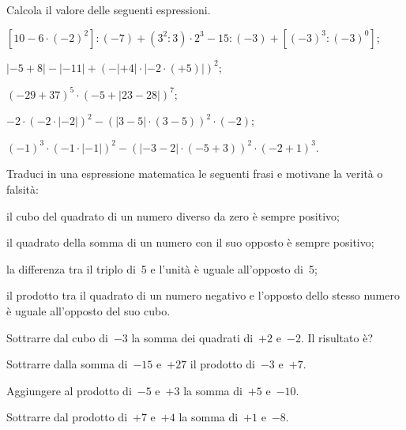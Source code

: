 \begin{esercizio}[\Ast]
Calcola il valore delle seguenti espressioni.
 \begin{enumeratea}
 \item $\left[10-6\cdot(-2)^2\right]:(-7)+\left(3^2:3\right)\cdot2^3-15:(-3)+\left[(-3)^3:(-3)^0\right]$;
 \item $|-5+8|-|-11|+(-|+4|\cdot|-2\cdot(+5)|)^2$;
 \item $(-29+37)^5\cdot(-5+|23-28|)^7$;
 \item $-2\cdot(-2\cdot|-2|)^2-(|3-5|\cdot(3-5))^2\cdot(-2)$;
 \item $(-1)^3\cdot(-1\cdot|-1|)^2-(|-3-2|\cdot(-5+3))^2\cdot(-2+1)^3$.
 \end{enumeratea}
\end{esercizio}
\begin{multicols}{2}
\begin{esercizio}
Traduci in una espressione matematica le seguenti frasi e motivane la verità o falsità:
 \begin{enumeratea}
 \item il cubo del quadrato di un numero diverso da zero è sempre positivo;
 \item il quadrato della somma di un numero con il suo opposto è sempre positivo;
 \item la differenza tra il triplo di~5 e l'unità è uguale all'opposto di~5;
 \item il prodotto tra il quadrato di un numero negativo e l'opposto dello stesso numero è uguale all'opposto del suo cubo.
 \end{enumeratea}
\end{esercizio}

\begin{esercizio}
 Sottrarre dal cubo di~$-3$ la somma dei quadrati di~$+2$ e~$-2$. Il risultato è?
\end{esercizio}

\begin{esercizio}
 Sottrarre dalla somma di~$-15$ e~$+27$ il prodotto di~$-3$ e~$+7$.
\end{esercizio}

\begin{esercizio}
 Aggiungere al prodotto di~$-5$ e~$+3$ la somma di~$+5$ e~$-10$.
\end{esercizio}

\begin{esercizio}
 Sottrarre dal prodotto di~$+7$ e~$+4$ la somma di~$+1$ e~$-8$.
\end{esercizio}


\end{multicols}
